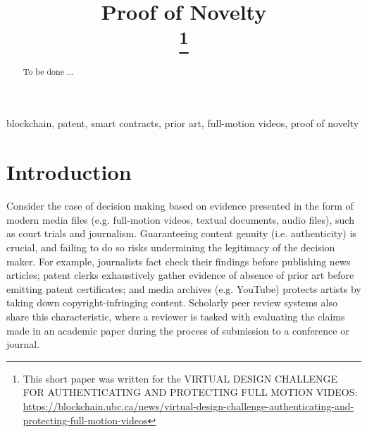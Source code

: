 \documentclass[conference]{IEEEtran}
\begin{document}
\title{Proof of Novelty\\
\thanks{This short paper was written for the VIRTUAL DESIGN CHALLENGE FOR AUTHENTICATING AND PROTECTING FULL MOTION VIDEOS: \url{https://blockchain.ubc.ca/news/virtual-design-challenge-authenticating-and-protecting-full-motion-videos}}
}

\author{
}

\maketitle

\begin{abstract}
To be done ...
\end{abstract}

\begin{IEEEkeywords}
blockchain, patent, smart contracts, prior art, full-motion videos, proof of novelty
\end{IEEEkeywords}

\section{Introduction}

Consider the case of decision making based on evidence presented in the form of modern media files (e.g. full-motion videos, textual documents, audio files), such as court trials and journalism. Guaranteeing content genuity (i.e. authenticity) is crucial, and failing to do so risks undermining the legitimacy of the decision maker. For example, journalists fact check their findings before publishing news articles; patent clerks exhaustively gather evidence of absence of prior art before emitting patent certificates; and media archives (e.g. YouTube) protects artists by taking down copyright-infringing content. Scholarly peer review systems also share this characteristic, where a reviewer is tasked with evaluating the claims made in an academic paper during the process of submission to a conference or journal. 
\end{document}
